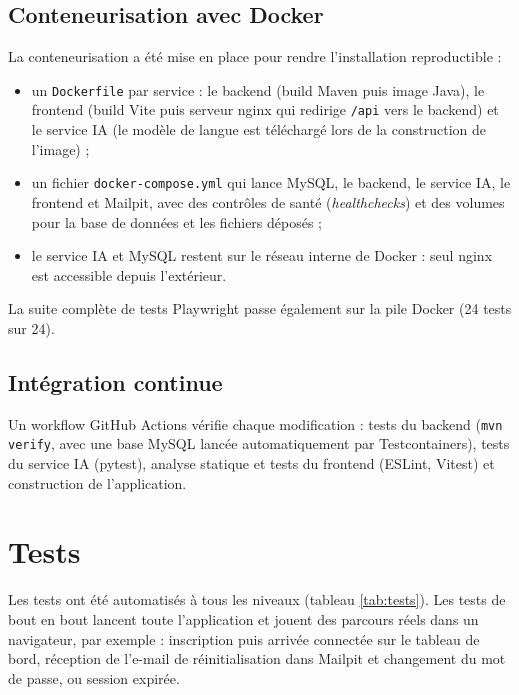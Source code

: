 \documentclass[12pt,a4paper]{report}
\begin{document}
\subsection{Conteneurisation avec Docker}
La conteneurisation a été mise en place pour rendre l'installation reproductible :
\begin{itemize}
  \item un \texttt{Dockerfile} par service : le backend (build Maven puis image Java), le frontend (build Vite puis serveur nginx qui redirige \texttt{/api} vers le backend) et le service IA (le modèle de langue est téléchargé lors de la construction de l'image) ;
  \item un fichier \texttt{docker-compose.yml} qui lance MySQL, le backend, le service IA, le frontend et Mailpit, avec des contrôles de santé (\emph{healthchecks}) et des volumes pour la base de données et les fichiers déposés ;
  \item le service IA et MySQL restent sur le réseau interne de Docker : seul nginx est accessible depuis l'extérieur.
\end{itemize}
La suite complète de tests Playwright passe également sur la pile Docker (24 tests sur 24).

\subsection{Intégration continue}
Un workflow GitHub Actions vérifie chaque modification : tests du backend (\texttt{mvn verify}, avec une base MySQL lancée automatiquement par Testcontainers), tests du service IA (pytest), analyse statique et tests du frontend (ESLint, Vitest) et construction de l'application.

\section{Tests}
Les tests ont été automatisés à tous les niveaux (tableau \ref{tab:tests}). Les tests de bout en bout lancent toute l'application et jouent des parcours réels dans un navigateur, par exemple : inscription puis arrivée connectée sur le tableau de bord, réception de l'e-mail de réinitialisation dans Mailpit et changement du mot de passe, ou session expirée.
\end{document}
